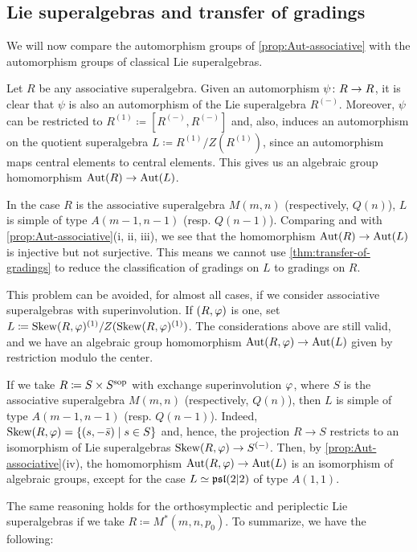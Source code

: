 \subsection{Lie superalgebras and transfer of gradings}\label{ssec:transfer-result-aut}

We will now compare the automorphism groups of \cref{prop:Aut-associative} with the automorphism groups of classical Lie superalgebras. 

Let $R$ be any associative superalgebra. 
Given an automorphism $\psi\colon R \to R$, it is clear that $\psi$ is also an automorphism of the Lie superalgebra $R^{(-)}$. 
Moreover, $\psi$ can be restricted to $R^{(1)} \coloneqq [ R^{(-)}, R^{(-)} ]$ and, also, induces an automorphism on the quotient superalgebra $L \coloneqq R^{(1)}/Z(R^{(1)})$, since an automorphism maps central elements to central elements. 
This gives us an algebraic group homomorphism $\operatorname{Aut}(R) \to \operatorname{Aut}(L)$. 

In the case $R$ is the associative superalgebra $M(m,n)$ (respectively, $Q(n)$), $L$ is simple of type $A(m-1, n-1)$ (resp. $Q(n-1)$). 
Comparing \cite[Theorem 1]{serganova} and \cite[Theorem 4.1]{Pianzola} with \cref{prop:Aut-associative}(i, ii, iii), we see that the homomorphism $\operatorname{Aut}(R) \to \operatorname{Aut}(L)$ is injective but not surjective. 
This means we cannot use \cref{thm:transfer-of-gradings} to reduce the classification of gradings on $L$ to gradings on $R$. 

This problem can be avoided, for almost all cases, if we consider associative superalgebras with superinvolution. 
If $(R, \varphi)$ is one, set $L \coloneqq \operatorname{Skew}(R, \varphi)^{(1)}/Z( \operatorname{Skew}(R, \varphi)^{(1)} )$. 
The considerations above are still valid, and we have an algebraic group homomorphism $\operatorname{Aut}(R, \varphi) \to \operatorname{Aut}(L)$ given by restriction modulo the center. 

If we take $R \coloneqq S\times S^{\mathrm{sop}}$ with exchange superinvolution $\varphi$, where $S$ is the associative superalgebra $M(m,n)$ (respectively, $Q(n)$), then $L$ %
is simple of type $A(m-1, n-1)$ (resp. $Q(n-1)$). 
Indeed, $\operatorname{Skew}(R, \varphi) = \{ (s, -\bar s) \mid s\in S \}$ and, hence, the projection $R \to S$ restricts to an isomorphism of Lie superalgebras $\operatorname{Skew}(R, \varphi) \to S^{(-)}$. 
Then, by \cref{prop:Aut-associative}(iv), the homomorphism $\operatorname{Aut}(R, \varphi) \to \operatorname{Aut}(L)$ is an isomorphism of algebraic groups, except for the case $L \simeq \mathfrak{psl}(2 | 2)$ of type $A(1,1)$.


The same reasoning holds for the orthosymplectic and periplectic Lie superalgebras if we take $R \coloneqq M^*(m, n, p_0)$. 
To summarize, we have the following:

